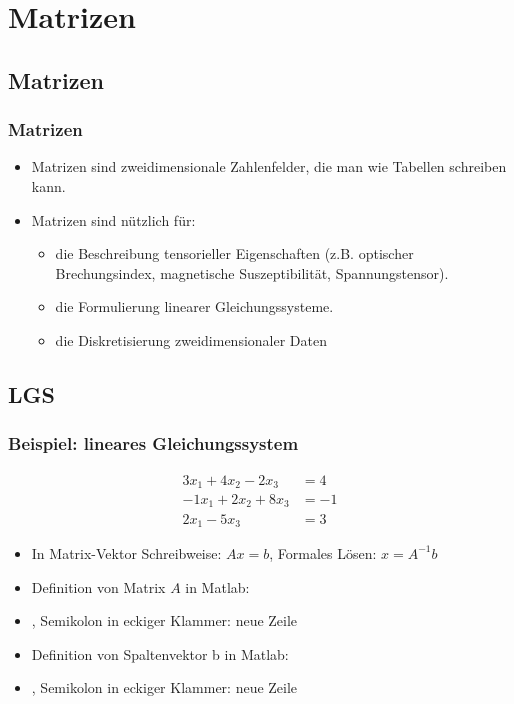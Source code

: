     \section{Matrizen}

    \subsection{Matrizen}
    \begin{frame}
        \frametitle{Matrizen}
        \begin{itemize}
            \item Matrizen sind zweidimensionale Zahlenfelder, die man wie Tabellen schreiben kann.
            \item Matrizen sind nützlich für:
            \begin{itemize}
                \item die Beschreibung tensorieller Eigenschaften  (z.B. optischer Brechungsindex, magnetische Suszeptibilität, Spannungstensor).
                \item die Formulierung linearer Gleichungssysteme.
                \item die Diskretisierung zweidimensionaler Daten
            \end{itemize}
        \end{itemize}
    \end{frame}

    \subsection{LGS}
    \begin{frame}
        \frametitle{Beispiel: lineares Gleichungssystem}

        \begin{align*}
            3x_{1} + 4x_{2} - 2x_{3}  &= 4 \\
            -1x_{1} + 2x_{2} + 8x_{3} &= -1 \\
            2x_{1} - 5x_{3}  &= 3
        \end{align*}

        \begin{itemize}
            \item In Matrix-Vektor Schreibweise: $Ax = b$, Formales Lösen: $x = A^{-1}b$
            \item Definition von Matrix $A$ in Matlab:
            \item {}, Semikolon in eckiger Klammer: neue Zeile
            \item Definition von Spaltenvektor b in Matlab:
            \item {}, Semikolon in eckiger Klammer: neue Zeile
        \end{itemize}
    \end{frame}

